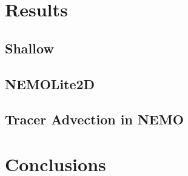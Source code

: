 \documentclass[12pt]{article}
\begin{document}
\section{Results}

\subsection{Shallow}

\subsection{NEMOLite2D}

\subsection{Tracer Advection in NEMO}

\section{Conclusions}



\end{document}
